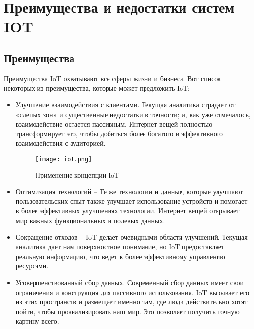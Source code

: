 \section{Преимущества и недостатки систем IOT}
\subsection{Преимущества}
Преимущества IoT охватывают все сферы жизни и бизнеса. Вот список некоторых из
преимущества, которые может предложить IoT:
\begin{itemize}
    \item Улучшение взаимодействия с клиентами. Текущая аналитика страдает от «слепых зон» и
    существенные недостатки в точности; и, как уже отмечалось, взаимодействие остается пассивным. Интернет вещей полностью
    трансформирует это, чтобы добиться более богатого и эффективного взаимодействия с аудиторией.
    \begin{figure}[h!]
        \centering
        \texttt{[image: iot.png]}
        \caption{Применение концепции IoT}
        \label{fig:task5:graph}
    \end{figure}
    \item Оптимизация технологий – Те же технологии и данные, которые улучшают
    пользовательских опыт также улучшает использование устройств и помогает в более эффективных улучшениях
    технологии. Интернет вещей открывает мир важных функциональных и полевых данных.
    \item Сокращение отходов – IoT делает очевидными области улучшений. Текущая аналитика дает нам
    поверхностное понимание, но IoT предоставляет реальную информацию, что ведет к более эффективному
    управлению ресурсами.
    \item  Усовершенствованный сбор данных. Современный сбор данных имеет свои ограничения и
    конструкция для пассивного использования. IoT вырывает его из этих пространств и размещает именно там, где
    люди действительно хотят пойти, чтобы проанализировать наш мир. Это позволяет получить точную картину всего.
\end{itemize}
